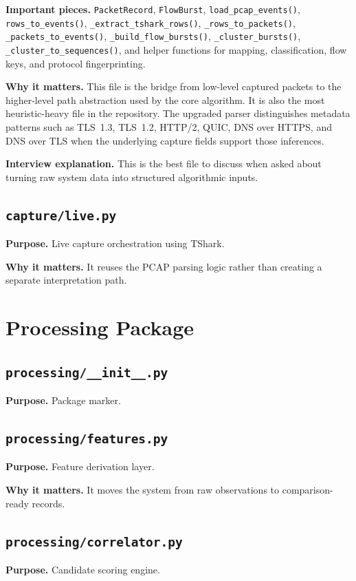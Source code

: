 \documentclass[12pt,a4paper]{report}
\begin{document}
\textbf{Important pieces.} \texttt{PacketRecord}, \texttt{FlowBurst}, \texttt{load\_pcap\_events()}, \texttt{rows\_to\_events()}, \texttt{\_extract\_tshark\_rows()}, \texttt{\_rows\_to\_packets()}, \texttt{\_packets\_to\_events()}, \texttt{\_build\_flow\_bursts()}, \texttt{\_cluster\_bursts()}, \texttt{\_cluster\_to\_sequences()}, and helper functions for mapping, classification, flow keys, and protocol fingerprinting.

\textbf{Why it matters.} This file is the bridge from low-level captured packets to the higher-level path abstraction used by the core algorithm. It is also the most heuristic-heavy file in the repository. The upgraded parser distinguishes metadata patterns such as TLS~1.3, TLS~1.2, HTTP/2, QUIC, DNS over HTTPS, and DNS over TLS when the underlying capture fields support those inferences.

\textbf{Interview explanation.} This is the best file to discuss when asked about turning raw system data into structured algorithmic inputs.

\section{\texttt{capture/live.py}}
\textbf{Purpose.} Live capture orchestration using TShark.

\textbf{Why it matters.} It reuses the PCAP parsing logic rather than creating a separate interpretation path.

\chapter{Processing Package}
\section{\texttt{processing/\_\_init\_\_.py}}
\textbf{Purpose.} Package marker.

\section{\texttt{processing/features.py}}
\textbf{Purpose.} Feature derivation layer.

\textbf{Why it matters.} It moves the system from raw observations to comparison-ready records.

\section{\texttt{processing/correlator.py}}
\textbf{Purpose.} Candidate scoring engine.
\end{document}
